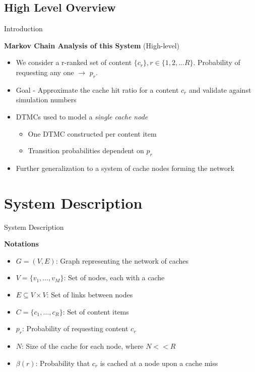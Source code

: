 \documentclass[
	xcolor={svgnames},
	hyperref={pagebackref,bookmarks},
	aspectratio=43,
]{beamer}
\begin{document}
\subsection*{High Level Overview}
\begin{frame}{Introduction}
\begin{block}{\textbf{Markov Chain Analysis of this System} (High-level)}
    \begin{itemize}
        \item We consider a r-ranked set of content $\{c_r\}, r \in \{1, 2, ... R\}$. Probability of requesting any one $\rightarrow$ $p_r$. 
        \item Goal - Approximate the cache hit ratio for a content $c_r$ and validate against simulation numbers
        \item DTMCs used to model a \textit{single cache node}
        \begin{itemize}
            \item One DTMC constructed per content item
            \item Transition probabilities dependent on $p_r$
        \end{itemize}
        \item Further generalization to a system of cache nodes forming the network
    \end{itemize}
\end{block}
\end{frame}

\section{System Description}
\begin{frame}{System Description}
    \begin{block}{\textbf{Notations}}
        \begin{itemize}
            \item $G = (V, E)$: Graph representing the network of caches
            \item $V = \{v_1, \ldots,  v_M\}$: Set of nodes, each with a cache
            \item $E \subseteq V \times V$: Set of links between nodes
            \item $C = \{c_1, \ldots, c_R\}$: Set of content items
            \item $p_r$: Probability of requesting content $c_r$
            \item $N$: Size of the cache for each node, where $N << R$
            \item $\beta(r)$: Probability that $c_r$ is cached at a node upon a cache miss
        \end{itemize}
    \end{block}
\end{frame}
\end{document}
